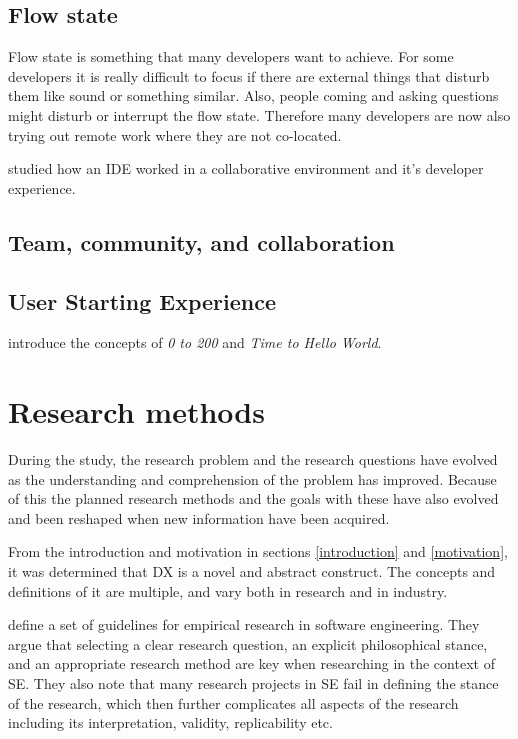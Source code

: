 \documentclass[english, 12pt, a4paper, sci, utf8, a-1b, online]{aaltothesis}
\begin{document}
\subsection{Flow state}

Flow state is something that many developers want to achieve. For some developers it is really difficult to focus if there are external things that disturb them like sound or something similar. Also, people coming and asking questions might disturb or interrupt the flow state. Therefore many developers are now also trying out remote work where they are not co-located.

\cite{design-framework-enchancing} studied how an IDE worked in a collaborative environment and it's developer experience.

\subsection{Team, community, and collaboration}

\cite{entering-an-ecosystem} 

\subsection{User Starting Experience}

\cite{api-designers} introduce the concepts of \textit{0 to 200} and \textit{Time to Hello World}.

\clearpage
\section{Research methods}

During the study, the research problem and the research questions have evolved as the understanding and comprehension of the problem has improved. Because of this the planned research methods and the goals with these have also evolved and been reshaped when new information have been acquired.

From the introduction and motivation in sections \ref{introduction} and \ref{motivation}, it was determined that DX is a novel and abstract construct. The concepts and definitions of it are multiple, and vary both in research and in industry.

\cite{easterbrook2008selecting} define a set of guidelines for empirical research in software engineering. They argue that selecting a clear research question, an explicit philosophical stance, and an appropriate research method are key when researching in the context of SE. They also note that many research projects in SE fail in defining the stance of the research, which then further complicates all aspects of the research including its interpretation, validity, replicability etc.
\end{document}
